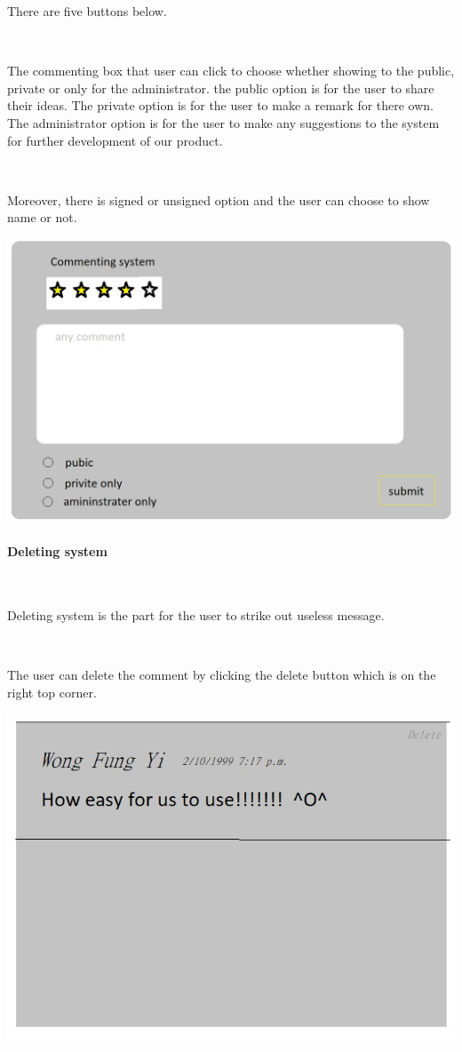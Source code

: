There are five buttons below.\par~

The commenting box that user can click to choose whether showing to the public, private or only for the administrator. the public option is for the user to share their ideas. The private option is for the user to make a remark for there own. The administrator option is for the user to make any suggestions to the system for further development of our product.\par~

Moreover, there is signed or unsigned option and the user can choose to show name or not.

\includegraphics[scale=0.5]{Doc/Graphics/sdfg}

\paragraph{Deleting system}~

Deleting system is the part for the user to strike out useless message.\par~

The user can delete the comment by clicking the delete button which is on the right top corner.

\includegraphics[scale=0.5]{Doc/Graphics/asdf}
